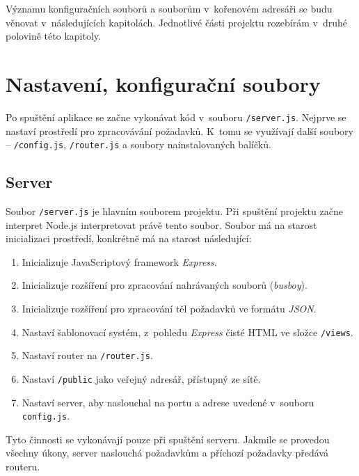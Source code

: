 Významu konfiguračních souborů a souborům v~kořenovém adresáři se budu věnovat v~následujících kapitolách. Jednotlivé části projektu rozebírám v~druhé polovině této kapitoly.

\section{Nastavení, konfigurační soubory}
Po spuštění aplikace se začne vykonávat kód v~souboru \texttt{/server.js}. Nejprve se nastaví prostředí pro zpracovávání požadavků. K~tomu se využívají další soubory -- \texttt{/config.js}, \texttt{/router.js} a soubory nainstalovaných balíčků.

\subsection{Server}
Soubor \texttt{/server.js} je hlavním souborem projektu. Při spuštění projektu začne interpret Node.js interpretovat právě tento soubor. Soubor má na starost inicializaci prostředí, konkrétně má na starost následující:
\begin{enumerate}
\item Inicializuje JavaScriptový framework \textit{Express}.
\item Inicializuje rozšíření pro zpracování nahrávaných souborů (\textit{busboy}).
\item Inicializuje rozšíření pro zpracování těl požadavků ve formátu \textit{JSON}.
\item Nastaví šablonovací systém, z~pohledu \textit{Express} čisté HTML ve složce \texttt{/views}.
\item Nastaví router na \texttt{/router.js}.
\item Nastaví \texttt{/public} jako veřejný adresář, přístupný ze sítě.
\item Nastaví server, aby naslouchal na portu a adrese uvedené v~souboru \texttt{config.js}.
\end{enumerate}
Tyto činnosti se vykonávají pouze při spuštění serveru. Jakmile se provedou všechny úkony, server naslouchá požadavkům a příchozí požadavky předává routeru.


